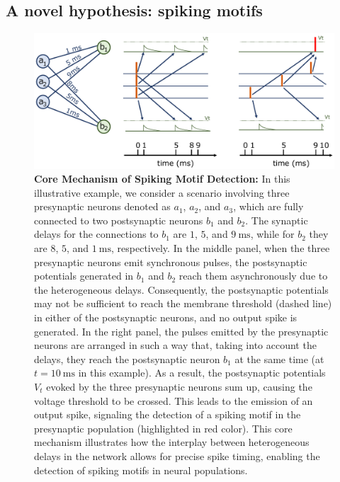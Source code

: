 \documentclass[runningheads]{llncs}
\newcommand{\ms}{\si{\milli\second}}%
\begin{document}
\subsection{A novel hypothesis: spiking motifs}
%
\begin{figure}%
  \centering
  \includegraphics[width=0.98\linewidth]{figures/izhikevich.pdf}%
    \caption{
      \textbf{Core Mechanism of Spiking Motif Detection:}
      In this illustrative example, we consider a scenario involving three presynaptic neurons denoted as $a_1$, $a_2$, and $a_3$, which are fully connected to two postsynaptic neurons $b_1$ and $b_2$. The synaptic delays for the connections to $b_1$ are $1$, $5$, and $9~\ms$, while for $b_2$ they are $8$, $5$, and $1~\ms$, respectively.
      In the middle panel, when the three presynaptic neurons emit synchronous pulses, the postsynaptic potentials generated in $b_1$ and $b_2$ reach them asynchronously due to the heterogeneous delays. Consequently, the postsynaptic potentials may not be sufficient to reach the membrane threshold (dashed line) in either of the postsynaptic neurons, and no output spike is generated.
      In the right panel, the pulses emitted by the presynaptic neurons are arranged in such a way that, taking into account the delays, they reach the postsynaptic neuron $b_1$ at the same time (at $t=10~\ms$ in this example). As a result, the postsynaptic potentials $V_t$ evoked by the three presynaptic neurons sum up, causing the voltage threshold to be crossed. This leads to the emission of an output spike, signaling the detection of a spiking motif in the presynaptic population (highlighted in red color).
      This core mechanism illustrates how the interplay between heterogeneous delays in the network allows for precise spike timing, enabling the detection of spiking motifs in neural populations. %
    }
  \label{fig:izhikevich}
\end{figure}
\end{document}
